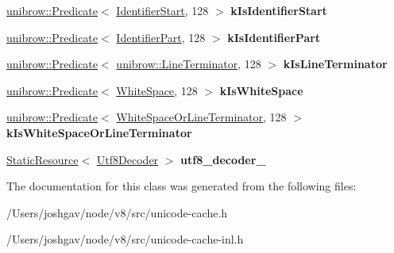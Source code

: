 \begin{DoxyCompactItemize}
\item 
\hyperlink{classunibrow_1_1_predicate}{unibrow\+::\+Predicate}$<$ \hyperlink{structv8_1_1internal_1_1_identifier_start}{Identifier\+Start}, 128 $>$ {\bfseries k\+Is\+Identifier\+Start}\hypertarget{classv8_1_1internal_1_1_unicode_cache_a036f12d86698ce0763d59e69408e9287}{}\label{classv8_1_1internal_1_1_unicode_cache_a036f12d86698ce0763d59e69408e9287}

\item 
\hyperlink{classunibrow_1_1_predicate}{unibrow\+::\+Predicate}$<$ \hyperlink{structv8_1_1internal_1_1_identifier_part}{Identifier\+Part}, 128 $>$ {\bfseries k\+Is\+Identifier\+Part}\hypertarget{classv8_1_1internal_1_1_unicode_cache_ad3f3a1b8eb4a115a4194cf8ea9d84fd4}{}\label{classv8_1_1internal_1_1_unicode_cache_ad3f3a1b8eb4a115a4194cf8ea9d84fd4}

\item 
\hyperlink{classunibrow_1_1_predicate}{unibrow\+::\+Predicate}$<$ \hyperlink{structunibrow_1_1_line_terminator}{unibrow\+::\+Line\+Terminator}, 128 $>$ {\bfseries k\+Is\+Line\+Terminator}\hypertarget{classv8_1_1internal_1_1_unicode_cache_ab49183c28aa480ec7d2a1f44c296ae08}{}\label{classv8_1_1internal_1_1_unicode_cache_ab49183c28aa480ec7d2a1f44c296ae08}

\item 
\hyperlink{classunibrow_1_1_predicate}{unibrow\+::\+Predicate}$<$ \hyperlink{structv8_1_1internal_1_1_white_space}{White\+Space}, 128 $>$ {\bfseries k\+Is\+White\+Space}\hypertarget{classv8_1_1internal_1_1_unicode_cache_ac69883c40afece52d138e3e0a688bd7f}{}\label{classv8_1_1internal_1_1_unicode_cache_ac69883c40afece52d138e3e0a688bd7f}

\item 
\hyperlink{classunibrow_1_1_predicate}{unibrow\+::\+Predicate}$<$ \hyperlink{structv8_1_1internal_1_1_white_space_or_line_terminator}{White\+Space\+Or\+Line\+Terminator}, 128 $>$ {\bfseries k\+Is\+White\+Space\+Or\+Line\+Terminator}\hypertarget{classv8_1_1internal_1_1_unicode_cache_a8e0273810465631e9e47108ea4fd0e22}{}\label{classv8_1_1internal_1_1_unicode_cache_a8e0273810465631e9e47108ea4fd0e22}

\item 
\hyperlink{classv8_1_1internal_1_1_static_resource}{Static\+Resource}$<$ \hyperlink{classunibrow_1_1_utf8_decoder}{Utf8\+Decoder} $>$ {\bfseries utf8\+\_\+decoder\+\_\+}\hypertarget{classv8_1_1internal_1_1_unicode_cache_a673f944e946f973a896f1d6baa637cca}{}\label{classv8_1_1internal_1_1_unicode_cache_a673f944e946f973a896f1d6baa637cca}

\end{DoxyCompactItemize}


The documentation for this class was generated from the following files\+:\begin{DoxyCompactItemize}
\item 
/\+Users/joshgav/node/v8/src/unicode-\/cache.\+h\item 
/\+Users/joshgav/node/v8/src/unicode-\/cache-\/inl.\+h\end{DoxyCompactItemize}
